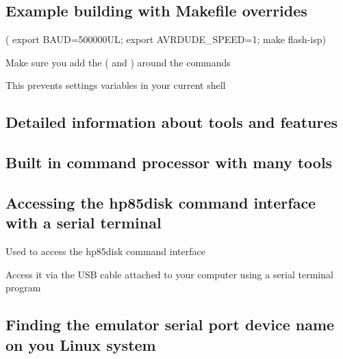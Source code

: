 \subsection*{Example building with Makefile overrides}


\begin{DoxyItemize}
\item ( export B\+A\+UD=500000\+UL; export A\+V\+R\+D\+U\+D\+E\+\_\+\+S\+P\+E\+ED=1; make flash-\/isp)
\begin{DoxyItemize}
\item Make sure you add the \textquotesingle{}(\textquotesingle{} and \textquotesingle{})\textquotesingle{} around the commands
\begin{DoxyItemize}
\item This prevents settings variables in your current shell 


\end{DoxyItemize}
\end{DoxyItemize}
\end{DoxyItemize}

\subsection*{Detailed information about tools and features}

\subsection*{Built in command processor with many tools}

\subsection*{Accessing the hp85disk command interface with a serial terminal}


\begin{DoxyItemize}
\item Used to access the hp85disk command interface
\item Access it via the U\+SB cable attached to your computer using a serial terminal program
\end{DoxyItemize}

\subsection*{Finding the emulator serial port device name on you Linux system}


